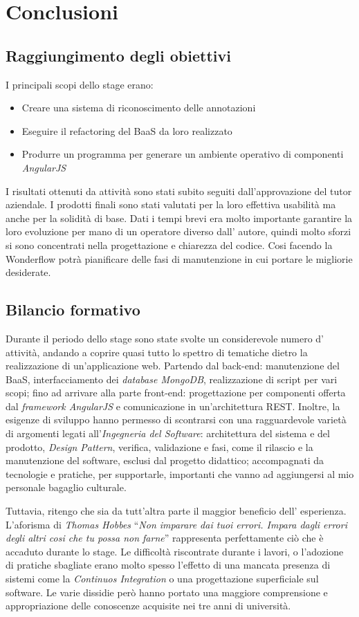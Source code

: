 \chapter{Conclusioni}
\label{cap:conclusioni}
\section{Raggiungimento degli obiettivi}
I principali scopi dello stage erano:
\begin{itemize}
\item Creare una sistema di riconoscimento delle annotazioni
\item Eseguire il \gls{refactoring} del \gls{BaaS} da loro realizzato
\item Produrre un programma per generare un ambiente operativo di componenti
 \textit{AngularJS}
\end{itemize}

I risultati ottenuti da attività sono stati subito seguiti dall'approvazione del
tutor aziendale. I prodotti finali sono stati valutati per la loro effettiva
usabilità ma anche per la solidità di base. Dati i tempi brevi era molto
importante garantire la loro evoluzione per mano di un operatore diverso dall'
autore, quindi molto sforzi si sono concentrati nella progettazione e chiarezza
del codice. Cosi  facendo la Wonderflow potrà pianificare delle fasi di
manutenzione in cui portare le migliorie desiderate.

\section{Bilancio formativo}
Durante il periodo dello stage sono state svolte un considerevole numero d'
attività, andando a coprire quasi tutto lo spettro di tematiche dietro la
realizzazione di un'applicazione web. Partendo dal \gls{back-end}: manutenzione
del \gls{BaaS}, interfacciamento dei \textit{database MongoDB}, realizzazione di
script per vari scopi; fino ad arrivare alla parte \gls{front-end}:
progettazione per componenti offerta dal \textit{framework AngularJS} e
comunicazione in un'architettura \gls{REST}. Inoltre, la esigenze di sviluppo
hanno permesso di scontrarsi con una ragguardevole varietà di argomenti legati
all'\textit{Ingegneria del Software}: architettura del sistema e del prodotto,
\textit{Design Pattern}, verifica, validazione e fasi, come il rilascio
e la manutenzione del software, esclusi dal progetto didattico; accompagnati
da tecnologie e pratiche, per supportarle, importanti che vanno ad aggiungersi
al mio personale bagaglio culturale.

Tuttavia, ritengo che sia da tutt'altra parte il maggior beneficio dell'
esperienza. L'aforisma di \textit{Thomas Hobbes} ``\textit{Non imparare dai tuoi
errori. Impara dagli errori degli altri cosi che tu possa non farne}''
rappresenta perfettamente ciò che è accaduto durante lo stage. Le difficoltà
riscontrate durante i lavori, o l'adozione di pratiche sbagliate erano molto
spesso l'effetto di una mancata presenza di sistemi come la \textit{Continuos
Integration} o una progettazione superficiale sul software. Le varie dissidie
però hanno portato una maggiore comprensione e appropriazione delle conoscenze
acquisite nei tre anni di università.
